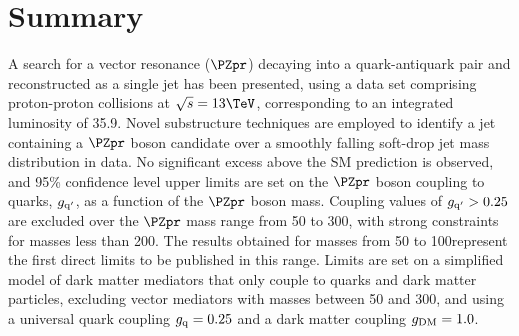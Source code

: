 \documentclass[11pt,twoside,a4paper,cmspaper,final,collab]{cms-tdr}
\begin{document}
\section{Summary}

A search for a vector resonance ($\PZpr$) decaying into a quark-antiquark pair and reconstructed as a single jet 
has been presented, using a data set comprising proton-proton collisions at \mbox{$\sqrt{s}=13\TeV$}, corresponding to an integrated
luminosity of 35.9\fbinv.
Novel substructure techniques are employed to identify a jet containing a $\PZpr$ boson candidate
over a smoothly falling soft-drop jet mass distribution in data.
No significant excess above the SM prediction is observed, 
and 95\% confidence level upper limits are set on the $\PZpr$ boson coupling to quarks, $g_{\rm q^{\prime}}$, as a function of the
$\PZpr$ boson mass. 
Coupling values of $g_{\rm q^{\prime}} > 0.25$ are excluded over the $\PZpr$ mass range from
50 to 300\GeV, with strong constraints for masses less than 200\GeV.
The results obtained for masses
from 50 to 100\GeV represent the first 
direct limits to be published in this range.
Limits are set on a simplified model of dark matter mediators 
that only couple to quarks and dark matter particles, 
excluding vector mediators with masses between 50 and 300\GeV, 
and using a universal quark coupling $g_{\rm q} = 0.25$ and a dark matter coupling $g_{\rm DM} = 1.0$.
\label{sec:res}
\end{document}
